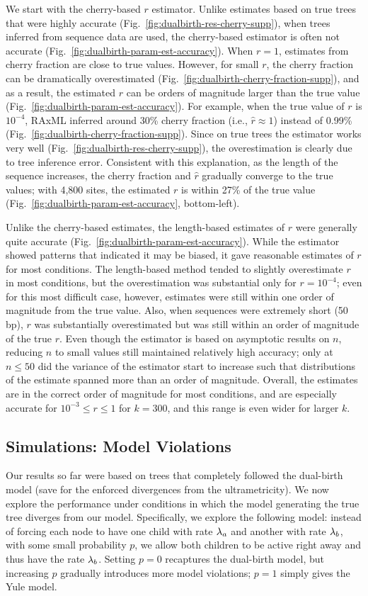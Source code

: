 We start with the cherry-based $r$ estimator. Unlike estimates based on true trees that were highly accurate (Fig.~\ref{fig:dualbirth-res-cherry-supp}), when trees inferred from sequence data are used, the cherry-based estimator is often not accurate (Fig.~\ref{fig:dualbirth-param-est-accuracy}). When $r=1$, estimates from cherry fraction are close to true values. However, for small $r$, the cherry fraction can be dramatically overestimated (Fig.~\ref{fig:dualbirth-cherry-fraction-supp}), and as a result, the estimated $r$ can be orders of magnitude larger than the true value (Fig.~\ref{fig:dualbirth-param-est-accuracy}). For example, when the true value of $r$ is $10^{-4}$, RAxML inferred around 30\% cherry fraction (i.e., $\hat{r}\approx 1$) instead of 0.99\% (Fig.~\ref{fig:dualbirth-cherry-fraction-supp}). Since on true trees the estimator works very well (Fig.~\ref{fig:dualbirth-res-cherry-supp}), the overestimation is clearly due to tree inference error. Consistent with this explanation, as the length of the sequence increases, the cherry fraction and $\hat{r}$ gradually converge to the true values; with 4,800 sites, the estimated $r$ is within 27\% of the true value (Fig.~\ref{fig:dualbirth-param-est-accuracy}, bottom-left).

Unlike the cherry-based estimates, the length-based estimates of $r$ were generally
quite accurate (Fig.~\ref{fig:dualbirth-param-est-accuracy}).
While the estimator showed patterns that indicated it may be biased, it gave reasonable estimates of $r$ for most conditions. The length-based method tended to slightly overestimate $r$ in most conditions, but the overestimation was substantial only for $r=10^{-4}$; even for this most difficult case, however, estimates were still  within one order of magnitude from the true value. Also, when sequences were extremely short (50 \gls{bp}), $r$ was substantially overestimated but was still within an order of magnitude of the true $r$. Even though the estimator is based on asymptotic results on $n$, reducing $n$ to small values still maintained relatively high accuracy; only at $n\leq 50$ did the variance of the estimator start to increase such that distributions of the estimate spanned more than an order of magnitude. Overall, the estimates are in the correct order of magnitude for most conditions, and are especially accurate for $10^{-3}\leq r\leq1$ for $k=300$, and this range is even wider for larger $k$.

\subsection{Simulations: Model Violations}
Our results so far were based on trees that completely followed the dual-birth model (save for the enforced divergences from the ultrametricity). We now explore the performance under conditions in which the  model generating the true tree diverges from our model. Specifically, we explore the following model: instead of forcing each node to have one child with rate $\lambda_a$ and another with rate $\lambda_b$, with some small probability $p$, we allow both children to be active right away and thus have the rate $\lambda_b$. Setting $p=0$ recaptures the dual-birth model, but increasing $p$ gradually introduces more model violations; $p=1$ simply gives the Yule model.

